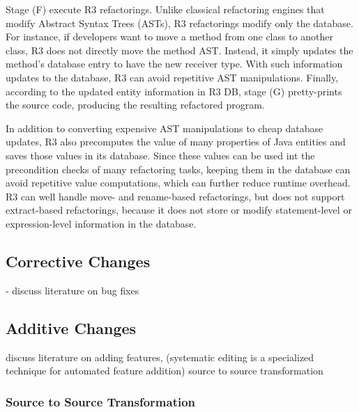 \documentclass[runningheads,a4paper]{llncs}
\begin{document}
Stage (F) execute R3 refactorings. Unlike classical refactoring engines that modify Abstract Syntax Trees (ASTs), R3 refactorings modify only the database. For instance, if developers want to move a method from one class to another class, R3 does not directly move the method AST. Instead, it simply updates the method's database entry to have the new receiver type. With such information updates to the database, R3 can avoid repetitive AST manipulations. Finally, according to the updated entity information in R3 DB, stage (G) pretty-prints the source code, producing the resulting refactored program.

In addition to converting expensive AST manipulations to cheap database updates, R3 also precomputes the value of many properties of Java entities and saves those values in its database. Since these values can be used int the precondition checks of many refactoring tasks, keeping them in the database can avoid repetitive value computations, which can further reduce runtime overhead. R3 can well handle move- and rename-based refactorings, but does not support extract-based refactorings, because it does not store or modify statement-level or expression-level information in the database.  


\subsection{Corrective Changes} 
	- discuss literature on bug fixes  

\subsection{Additive Changes}
discuss literature on adding features, (systematic editing is a specialized technique for automated feature addition) source to source transformation 


\subsubsection{Source to Source Transformation} 
\end{document}
